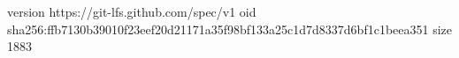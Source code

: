 version https://git-lfs.github.com/spec/v1
oid sha256:ffb7130b39010f23eef20d21171a35f98bf133a25c1d7d8337d6bf1c1beea351
size 1883
